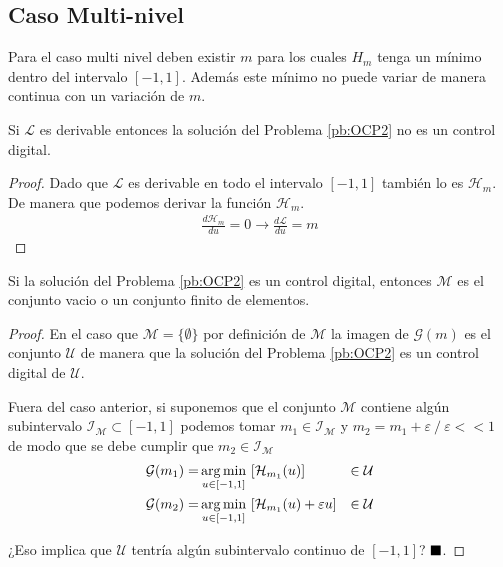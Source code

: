 \subsection{Caso Multi-nivel}
Para el caso multi nivel deben existir $m$ para los cuales $H_m$ tenga un mínimo dentro del intervalo $[-1,1]$. Además este mínimo no puede variar de manera continua con un variación de $m$.
\vspace{1em}
\begin{proposition}
    Si $\mathcal{L}$ es derivable entonces la solución del Problema \ref{pb:OCP2} no es un control digital.
\end{proposition}
\begin{proof}
    Dado que $\mathcal{L}$ es derivable en todo el intervalo $[-1,1]$ también lo es $\mathcal{H}_m$. De manera que podemos derivar la función $\mathcal{H}_m$.
    \begin{gather}
        \frac{d \mathcal{H}_m}{du} = 0 \rightarrow
        \frac{d \mathcal{L}}{du} = m
    \end{gather}
\end{proof}
\vspace{1em}
\begin{proposition}
    Si la solución del Problema \ref{pb:OCP2} es un control digital, entonces $\mathcal{M}$ es el conjunto vacio o  un conjunto finito de elementos. 
\end{proposition}
\begin{proof}

En el caso que $\mathcal{M} = \{\emptyset\}$ por definición de $\mathcal{M}$ la imagen de $\mathcal{G}(m)$ es el conjunto $\mathcal{U}$ de manera que la solución del Problema \ref{pb:OCP2} es un control digital de $\mathcal{U}$.  

Fuera del caso anterior, si suponemos que el conjunto $\mathcal{M}$ contiene algún subintervalo $\mathcal{I}_{\mathcal{M}} \subset[-1,1]$ podemos tomar    $m_1 \in \mathcal{I}_{\mathcal{M}}$ y $ m_2 = m_1 + \varepsilon \ / \ \varepsilon << 1$ de modo que se debe cumplir que $m_2 \in \mathcal{I}_{\mathcal{M}}$
\begin{equation}
    \begin{aligned}
        \mathcal{G}(m_1) = & \argmin_{u\in[-1,1]} \ [\mathcal{H}_{m_1}(u)] & \in \mathcal{U}\\
        \mathcal{G}(m_2) = & \argmin_{u\in[-1,1]} \ [\mathcal{H}_{m_1}(u) + \varepsilon u]   & \in \mathcal{U} 
    \end{aligned}      
\end{equation}

¿Eso implica que $\mathcal{U}$ tentría algún subintervalo continuo de $[-1,1]$?
$\hfill\blacksquare$.
\end{proof} 



